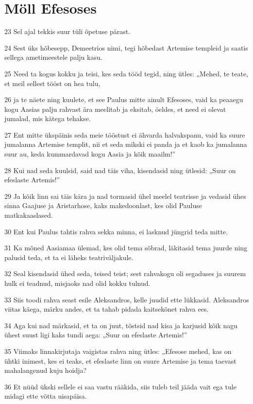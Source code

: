 \section*{Möll Efesoses}

\par 23 Sel ajal tekkis suur tüli õpetuse pärast.
\par 24 Sest üks hõbesepp, Demeetrios nimi, tegi hõbedast Artemise templeid ja saatis sellega ametimeestele palju kasu.
\par 25 Need ta kogus kokku ja teisi, kes seda tööd tegid, ning ütles: „Mehed, te teate, et meil sellest tööst on hea tulu,
\par 26 ja te näete ning kuulete, et see Paulus mitte ainult Efesoses, vaid ka peaaegu kogu Aasias palju rahvast ära meelitab ja eksitab, öeldes, et need ei olevat jumalad, mis kätega tehakse.
\par 27 Ent mitte ükspäinis seda meie tööstust ei ähvarda halvakspanu, vaid ka suure jumalanna Artemise templit, nii et seda mikski ei panda ja et kaob ka jumalanna suur au, keda kummardavad kogu Aasia ja kõik maailm!”
\par 28 Kui nad seda kuulsid, said nad täis viha, kisendasid ning ütlesid: „Suur on efeslaste Artemis!”
\par 29 Ja kõik linn sai täis kära ja nad tormasid ühel meelel teatrisse ja vedasid ühes sinna Gaajuse ja Aristarhose, kaks makedoonlast, kes olid Pauluse matkakaaslased.
\par 30 Ent kui Paulus tahtis rahva sekka minna, ei lasknud jüngrid teda mitte.
\par 31 Ka mõned Aasiamaa ülemad, kes olid tema sõbrad, läkitasid tema juurde ning palusid teda, et ta ei läheks teatriväljakule.
\par 32 Seal kisendasid ühed seda, teised teist; sest rahvakogu oli segaduses ja suurem hulk ei teadnud, misjaoks nad olid kokku tulnud.
\par 33 Siis toodi rahva seast esile Aleksandros, kelle juudid ette lükkasid. Aleksandros viitas käega, märku andes, et ta tahab pidada kaitsekõnet rahva ees.
\par 34 Aga kui nad märkasid, et ta on juut, tõstsid nad kisa ja karjusid kõik nagu ühest suust ligi kaks tundi aega: „Suur on efeslaste Artemis!”
\par 35 Viimaks linnakirjutaja vaigistas rahva ning ütles: „Efesose mehed, kas on ühtki inimest, kes ei teaks, et efeslaste linn on suure Artemise ja tema taevast mahalangenud kuju hoidja?
\par 36 Et nüüd ükski sellele ei saa vastu rääkida, siis tuleb teil jääda vait ega tule midagi ette võtta uisapäisa.
